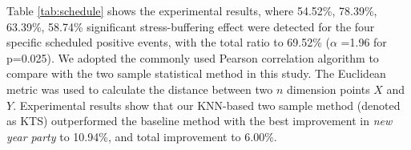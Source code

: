 \begin{table}[H]
\begin{center}
\caption{\small{Quantify the impact of scheduled positive school events using KTS (the KNN-based two sample method adopted in this research) and baseline method.}}
\label{tab:schedule}
\end{center}
\end{table}

Table \ref{tab:schedule} shows the experimental results,
where 54.52\%, 78.39\%, 63.39\%, 58.74\% significant stress-buffering effect were detected for the four specific scheduled positive events,
with the total ratio to 69.52\% ($\alpha$ =1.96 for p=0.025).
We adopted the commonly used Pearson correlation algorithm to compare with the two sample statistical method in this study.
The Euclidean metric was used to calculate the distance between two $n$ dimension points $X$ and $Y$.
Experimental results show that our KNN-based two sample method (denoted as KTS) outperformed the baseline method
with the best improvement in \emph{new year party} to 10.94\%,
and total improvement to 6.00\%.


